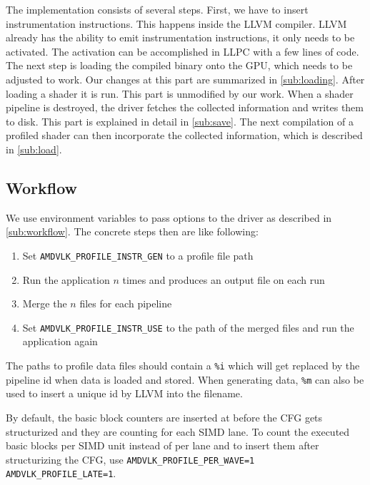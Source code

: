 \clearpage
{}
The implementation consists of several steps. First, we have to insert instrumentation instructions. This happens inside the LLVM compiler. LLVM already has the ability to emit instrumentation instructions, it only needs to be activated. The activation can be accomplished in LLPC with a few lines of code. The next step is loading the compiled binary onto the GPU, which needs to be adjusted to work. Our changes at this part are summarized in \cref{sub:loading}. After loading a shader it is run. This part is unmodified by our work. When a shader pipeline is destroyed, the driver fetches the collected information and writes them to disk. This part is explained in detail in \cref{sub:save}. The next compilation of a profiled shader can then incorporate the collected information, which is described in \cref{sub:load}.

\subsection{Workflow}
\label{sub:impl_workflow}
We use environment variables to pass options to the driver as described in \cref{sub:workflow}.
The concrete steps then are like following:
\begin{enumerate}
	\item Set \texttt{AMDVLK\_PROFILE\_INSTR\_GEN} to a profile file path
	\item Run the application $n$ times and produces an output file on each run
	\item Merge the $n$ files for each pipeline
	\item Set \texttt{AMDVLK\_PROFILE\_INSTR\_USE} to the path of the merged files and run the application again
\end{enumerate}
The paths to profile data files should contain a \texttt{\%i} which will get replaced by the pipeline id when data is loaded and stored.
When generating data, \texttt{\%m} can also be used to insert a unique id by LLVM into the filename.

By default, the basic block counters are inserted at before the CFG gets structurized and they are counting for each SIMD lane.
To count the executed basic blocks per SIMD unit instead of per lane and to insert them after structurizing the CFG, use \texttt{AMDVLK\_PROFILE\_PER\_WAVE=1 AMDVLK\_PROFILE\_LATE=1}.


